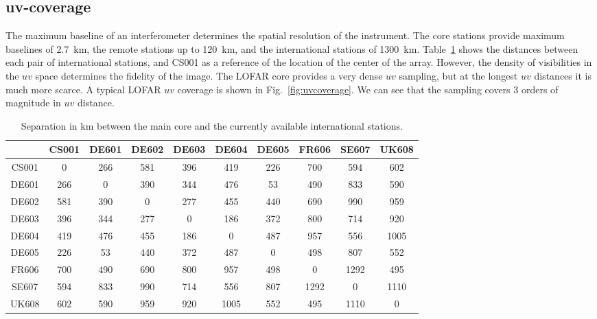 \documentclass[graybox]{svmult}
\begin{document}
\subsection{uv-coverage}\label{sec:uvcoverage}

The maximum baseline of an interferometer determines the spatial resolution of
the instrument. The core stations provide maximum baselines of 2.7~km, the
remote stations up to 120~km, and the international stations of 1300~km.
Table~\ref{tab:baselines} shows the distances between each pair of international
stations, and CS001 as a reference of the location of the center of the array.
However, the density of visibilities in the $uv$ space determines the fidelity
of the image. The LOFAR core provides a very dense $uv$ sampling, but at the
longest $uv$ distances it is much more scarce. A typical LOFAR $uv$ coverage is
shown in Fig.~\ref{fig:uvcoverage}. We can see that the sampling covers 3 orders
of magnitude in $uv$ distance.


\begin{table}[h]
\centering
\begin{tabular}{cccccccccc}
\hline
\hline
      & CS001& DE601& DE602& DE603& DE604& DE605& FR606& SE607& UK608\\
\hline
 CS001&     0&   266&   581&   396&   419&   226&   700&   594&   602 \\
 DE601&   266&     0&   390&   344&   476&    53&   490&   833&   590 \\
 DE602&   581&   390&     0&   277&   455&   440&   690&   990&   959 \\
 DE603&   396&   344&   277&     0&   186&   372&   800&   714&   920 \\
 DE604&   419&   476&   455&   186&     0&   487&   957&   556&  1005 \\
 DE605&   226&    53&   440&   372&   487&     0&   498&   807&   552 \\
 FR606&   700&   490&   690&   800&   957&   498&     0&  1292&   495 \\
 SE607&   594&   833&   990&   714&   556&   807&  1292&     0&  1110 \\
 UK608&   602&   590&   959&   920&  1005&   552&   495&  1110&     0 \\
\hline
\end{tabular}
\caption{Separation in km between the main core and the currently available
international stations.
\label{tab:baselines}}
\end{table}
\end{document}
